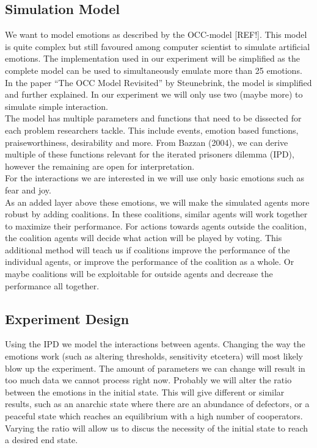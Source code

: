 \subsection*{Simulation Model}
We want to model emotions as described by the OCC-model [REF!]. This model is quite complex but still favoured among computer scientist to simulate artificial emotions. The implementation used in our experiment will be simplified as the complete model can be used to simultaneously emulate more than 25 emotions. In the paper ``The OCC Model Revisited'' by Steunebrink\cite{}, the model is simplified and further explained.  In our experiment we will only use two (maybe more) to simulate simple interaction. \\
The model has multiple parameters and functions that need to be dissected for each problem researchers tackle. This include events, emotion based functions, praiseworthiness, desirability and more. From Bazzan (2004), we can derive multiple of these functions relevant for the iterated prisoners dilemma (IPD), however the remaining are open for interpretation. \\
For the interactions we are interested in we will use only basic emotions such as fear and joy.\\

As an added layer above these emotions, we will make the simulated agents more robust by adding coalitions. In these coalitions, similar agents will work together to maximize their performance. For actions towards agents outside the coalition, the coalition agents will decide what action will be played by voting. This additional method will teach us if coalitions improve the performance of the individual agents, or improve the performance of the coalition as a whole. Or maybe coalitions will be exploitable for outside agents and decrease the performance all together.
\subsection*{Experiment Design}
Using the IPD we model the interactions between agents. Changing the way the emotions work (such as altering thresholds, sensitivity etcetera) will most likely blow up the experiment. The amount of parameters we can change will result in too much data we cannot process right now. Probably we will alter the ratio between the emotions in the initial state. This will give different or similar results, such as an anarchic state where there are an abundance of defectors, or a peaceful state which reaches an equilibrium with a high number of cooperators. Varying the ratio will allow us to discus the necessity of the initial state to reach a desired end state.